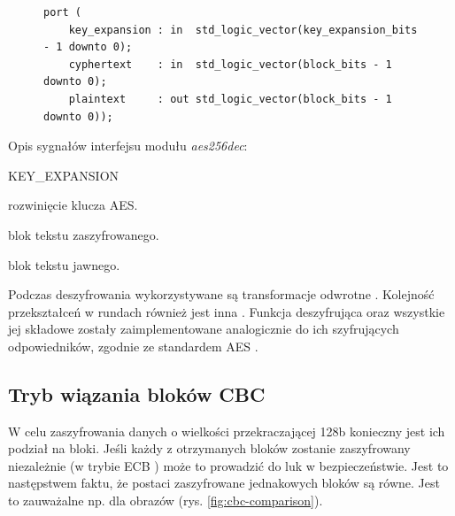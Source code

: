 \begin{figure}[!h]
\begin{lstlisting}[style=vhdl, captionpos=b, caption={\textit{aes256dec} -- interfejs i implementacja modułu deszyfrującego AES}, label={lst:aes-decryption-module}]
port (
	key_expansion : in  std_logic_vector(key_expansion_bits - 1 downto 0);
	cyphertext    : in  std_logic_vector(block_bits - 1 downto 0);
	plaintext     : out std_logic_vector(block_bits - 1 downto 0));
\end{lstlisting}
\end{figure}

Opis sygnałów interfejsu modułu \textit{aes256dec}:
\begin{interface}{KEY\_EXPANSION}
	\item[\insignal{KEY\_EXPANSION}] rozwinięcie klucza AES.
	\item[\insignal{CYPHERTEXT}] blok tekstu zaszyfrowanego.
	\item[\outsignal{PLAINTEXT}] blok tekstu jawnego.
\end{interface}

Podczas deszyfrowania wykorzystywane są transformacje odwrotne \cite[rozdz. 5.3.1-4]{aes-standard}. Kolejność przekształceń w rundach również jest inna \cite[rys. 12]{aes-standard}. Funkcja deszyfrująca oraz wszystkie jej składowe zostały zaimplementowane analogicznie do ich szyfrujących odpowiedników, zgodnie ze standardem AES \cite[rozdz. 5.3]{aes-standard}.

\subsection{Tryb wiązania bloków CBC}
W celu zaszyfrowania danych o wielkości przekraczającej 128b konieczny jest ich podział na bloki. Jeśli każdy z otrzymanych bloków zostanie zaszyfrowany niezależnie (w trybie ECB \cite{cbc-comparison}) może to prowadzić do luk w bezpieczeństwie. Jest to następstwem faktu, że postaci zaszyfrowane jednakowych bloków są równe. Jest to zauważalne np. dla obrazów (rys. \ref{fig:cbc-comparison}).

